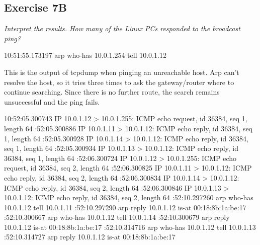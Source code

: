 \documentclass[a4paper, 11pt]{article}
\begin{document}
\subsection {Exercise 7B}

\emph{Interpret the results. How many of the Linux PCs responded to the broadcast ping?}

10:51:55.173197 arp who-has 10.0.1.254 tell 10.0.1.12 \newline \newline

This is the output of tcpdump when pinging an unreachable host. Arp can't resolve the host, so it tries three times to ask the gateway/router where to continue searching.
Since there is no further route, the search remains unsuccessful and the ping fails.

10:52:05.300743 IP 10.0.1.12 > 10.0.1.255: ICMP echo request, id 36384, seq 1, length 64 :52:05.300886 IP 10.0.1.11 > 10.0.1.12: ICMP echo reply, id 36384, seq 1, length 64 :52:05.300928 IP 10.0.1.14 > 10.0.1.12: ICMP echo reply, id 36384, seq 1, length 64 :52:05.300934 IP 10.0.1.13 > 10.0.1.12: ICMP echo reply, id 36384, seq 1, length 64 :52:06.300724 IP 10.0.1.12 > 10.0.1.255: ICMP echo request, id 36384, seq 2, length 64 :52:06.300825 IP 10.0.1.11 > 10.0.1.12: ICMP echo reply, id 36384, seq 2, length 64 :52:06.300834 IP 10.0.1.14 > 10.0.1.12: ICMP echo reply, id 36384, seq 2, length 64 :52:06.300846 IP 10.0.1.13 > 10.0.1.12: ICMP echo reply, id 36384, seq 2, length 64 :52:10.297260 arp who-has 10.0.1.12 tell 10.0.1.11 :52:10.297290 arp reply 10.0.1.12 is-at 00:18:8b:1a:be:17 :52:10.300667 arp who-has 10.0.1.12 tell 10.0.1.14 :52:10.300679 arp reply 10.0.1.12 is-at 00:18:8b:1a:be:17 :52:10.314716 arp who-has 10.0.1.12 tell 10.0.1.13 :52:10.314727 arp reply 10.0.1.12 is-at 00:18:8b:1a:be:17 \newline \newline
\end{document}
